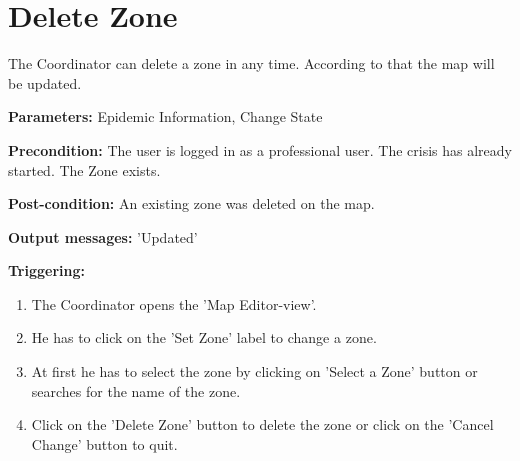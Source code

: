 \section{Delete Zone}
\label{operation:DeleteZone}
The Coordinator can delete a zone in any time. According
to that the map will be updated.\\
\begin{description}
\item \textbf{Parameters:} Epidemic Information, Change State
\item \textbf{Precondition:} The user is logged in as a professional user. The
crisis has already started. The Zone exists.
\item \textbf{Post-condition:} An existing zone was deleted on the map.
\item \textbf{Output messages:} 'Updated'
\item \textbf{Triggering:}
\begin{enumerate}
\item The Coordinator opens the 'Map Editor-view'.
\item He has to click on the 'Set Zone' label to change a zone.
\item At first he has to select the zone by clicking on 'Select a Zone' button
or searches for the name of the zone.
\item Click on the 'Delete Zone' button to delete the zone or click on the
'Cancel Change' button to quit.
\end{enumerate}
\end{description}   


